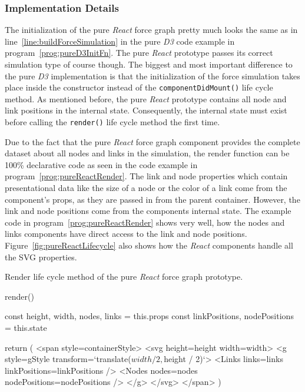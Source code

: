 \subsubsection{Implementation Details}

The initialization of the pure \emph{React} force graph pretty much looks the same as in line~\ref{line:buildForceSimulation} in the pure \emph{D3} code example in program~\ref{prog:pureD3InitFn}. The pure \emph{React} prototype passes its correct simulation type of course though. The biggest and most important difference to the pure \emph{D3} implementation is that the initialization of the force simulation takes place inside the constructor instead of the \texttt{componentDidMount()} life cycle method. As mentioned before, the pure \emph{React} prototype contains all node and link positions in the internal state. Consequently, the internal state must exist before calling the \texttt{render()} life cycle method the first time.

Due to the fact that the pure \emph{React} force graph component provides the complete dataset about all nodes and links in the simulation, the render function can be 100\% declarative code as seen in the code example in program~\ref{prog:pureReactRender}. The link and node properties which contain presentational data like the size of a node or the color of a link come from the component's props, as they are passed in from the parent container. However, the link and node positions come from the components internal state. The example code in program~\ref{prog:pureReactRender} shows very well, how the nodes and links components have direct access to the link and node positions. Figure~\ref{fig:pureReactLifecycle} also shows how the \emph{React} components handle all the SVG properties.

\begin{program}
\caption{Render life cycle method of the pure \emph{React} force graph prototype.}
\label{prog:pureReactRender}
\begin{JsCode}
render() {
  const { height, width, nodes, links } = this.props
  const { linkPositions, nodePositions } = this.state
  
  return (
    <span style={containerStyle}>
      <svg height={height} width={width}>
        <g style={gStyle} transform={`translate(${width / 2},${height / 2})`}>
          <Links links={links} linkPositions={linkPositions} />
          <Nodes nodes={nodes} nodePositions={nodePositions} />
        </g>
      </svg>
    </span>
  )
}
\end{JsCode}
\end{program}

